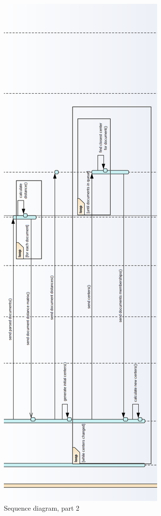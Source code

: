 \begin{figure}[H]
	\begin{center}
		\includegraphics[width=0.5\linewidth]{images/diagrams/seq2-h.png}
		\caption{Sequence diagram, part 2}
		\label{design-sequence-diagram-2}
	\end{center}
\end{figure}

